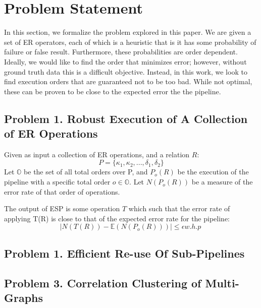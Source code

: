 \section{Problem Statement}
In this section, we formalize the problem explored in this paper.
We are given a set of ER operators,
each of which is a heuristic that is it has some probability of failure or false result.
Furthermore, these probabilities are order dependent.
Ideally, we would like to find the order that minimizes error; however, without ground
truth data this is a difficult objective.
Instead, in this work, we look to find execution orders that are guaranteed not to be too bad.
While not optimal, these can be proven to be close to the expected error the the pipeline.

\subsection{Problem 1. Robust Execution of A Collection of ER Operations}
Given as input a collection of ER operations, and a relation $R$:
\[P = \{\kappa_1, \kappa_2,...,\delta_1,\delta_2\} \]
Let $\mathbb{O}$ be the set of all total orders over P, and $P_o(R)$ be the execution
of the pipeline with a specific total order $o\in \mathbb{O}$.
Let $N(P_o(R))$ be a measure of the error rate of that order of operations.

The output of ESP is some operation $T$ which such that the error rate of applying 
T(R) is close to that of the expected error rate for the pipeline:
\[ \mid N(T(R)) - \mathbb{E}(N(P_o(R))) \mid \le \epsilon w.h.p \ \]

\subsection{Problem 1. Efficient Re-use Of Sub-Pipelines}

\subsection{Problem 3. Correlation Clustering of Multi-Graphs}
